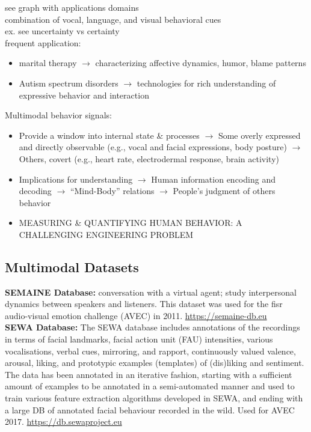see graph with applications domains\\
combination of vocal, language, and visual behavioral cues\\
ex. see uncertainty vs certainty\\
frequent application: 
\begin{itemize}
    \item marital therapy $\rightarrow$ characterizing affective dynamics, humor, blame patterns
    \item Autism spectrum disorders $\rightarrow$ technologies for rich understanding of expressive behavior and interaction
\end{itemize}

Multimodal behavior signals:\\
\begin{itemize}
    \item Provide a window into internal state \& processes $\rightarrow$ Some overly expressed and directly observable (e.g., vocal and facial expressions, body posture)
$\rightarrow$ Others, covert
(e.g., heart rate, electrodermal response, brain activity) 
    \item Implications for understanding $\rightarrow$ Human information encoding and decoding $\rightarrow$ “Mind-Body” relations
$\rightarrow$ People’s judgment of others behavior
    \item MEASURING \& QUANTIFYING HUMAN BEHAVIOR: A CHALLENGING ENGINEERING PROBLEM
\end{itemize}


\subsection{Multimodal Datasets}

\textbf{SEMAINE Database: }
conversation with a virtual agent; study interpersonal dynamics between
speakers and listeners. This dataset was used for the fisr audio-visual emotion challenge (AVEC) in 2011. \url{https://semaine-db.eu}\\

\textbf{SEWA Database: }
The SEWA database includes annotations of the recordings in terms of facial landmarks, facial action unit (FAU) intensities, various vocalisations, verbal cues, mirroring, and rapport, continuously valued valence, arousal, liking, and prototypic examples (templates) of (dis)liking and sentiment. The data has been annotated in an iterative fashion, starting with a sufficient amount of examples to be annotated in a semi-automated manner and used to train various feature extraction algorithms developed in SEWA, and ending with a large DB of annotated facial behaviour recorded in the wild. Used for AVEC 2017. \url{https://db.sewaproject.eu}\\



